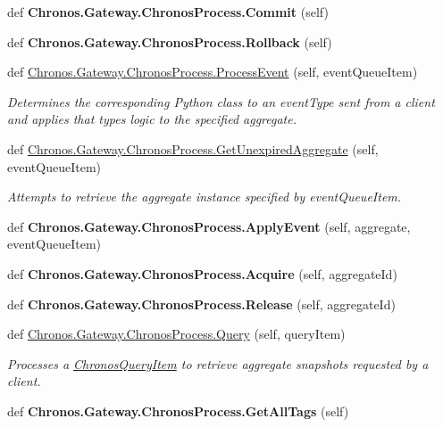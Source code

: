 \begin{DoxyCompactItemize}
\item 
def {\bfseries Chronos.\+Gateway.\+Chronos\+Process.\+Commit} (self)\hypertarget{group__Chronos_ga187be532ea701a1f7cb39f60a20cef15}{}\label{group__Chronos_ga187be532ea701a1f7cb39f60a20cef15}

\item 
def {\bfseries Chronos.\+Gateway.\+Chronos\+Process.\+Rollback} (self)\hypertarget{group__Chronos_ga953ae304f416c4d29f5e55c44ab1c87f}{}\label{group__Chronos_ga953ae304f416c4d29f5e55c44ab1c87f}

\item 
def \hyperlink{group__Chronos_ga5ae412d35ae2277be0ea6d2013d12129}{Chronos.\+Gateway.\+Chronos\+Process.\+Process\+Event} (self, event\+Queue\+Item)
\begin{DoxyCompactList}\small\item\em Determines the corresponding Python class to an event\+Type sent from a client and applies that type\textquotesingle{}s logic to the specified aggregate. \end{DoxyCompactList}\item 
def \hyperlink{group__Chronos_ga886ff894876545d6abaa78d677386d36}{Chronos.\+Gateway.\+Chronos\+Process.\+Get\+Unexpired\+Aggregate} (self, event\+Queue\+Item)
\begin{DoxyCompactList}\small\item\em Attempts to retrieve the aggregate instance specified by event\+Queue\+Item. \end{DoxyCompactList}\item 
def {\bfseries Chronos.\+Gateway.\+Chronos\+Process.\+Apply\+Event} (self, aggregate, event\+Queue\+Item)\hypertarget{group__Chronos_gab4bbf0d357fec40330b2d29a7ab79d61}{}\label{group__Chronos_gab4bbf0d357fec40330b2d29a7ab79d61}

\item 
def {\bfseries Chronos.\+Gateway.\+Chronos\+Process.\+Acquire} (self, aggregate\+Id)\hypertarget{group__Chronos_gae237c9609baf295c3889f6448d01beef}{}\label{group__Chronos_gae237c9609baf295c3889f6448d01beef}

\item 
def {\bfseries Chronos.\+Gateway.\+Chronos\+Process.\+Release} (self, aggregate\+Id)\hypertarget{group__Chronos_ga43656a9189b2db78bd8a7a026efa01b5}{}\label{group__Chronos_ga43656a9189b2db78bd8a7a026efa01b5}

\item 
def \hyperlink{group__Chronos_ga4c27fcd186b8c17d47b2d6a6d0dd8d55}{Chronos.\+Gateway.\+Chronos\+Process.\+Query} (self, query\+Item)
\begin{DoxyCompactList}\small\item\em Processes a \hyperlink{classChronos_1_1Gateway_1_1ChronosQueryItem}{Chronos\+Query\+Item} to retrieve aggregate snapshots requested by a client. \end{DoxyCompactList}\item 
def {\bfseries Chronos.\+Gateway.\+Chronos\+Process.\+Get\+All\+Tags} (self)\hypertarget{group__Chronos_ga140e0f13e47afbcd91f62873af44bbac}{}\label{group__Chronos_ga140e0f13e47afbcd91f62873af44bbac}


\end{DoxyCompactItemize}
